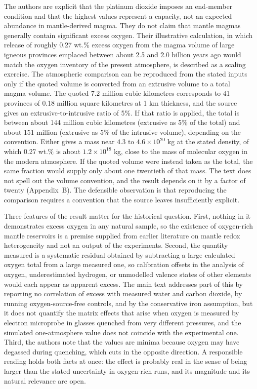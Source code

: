 \documentclass[11pt]{article}
\begin{document}
The authors are explicit that the platinum dioxide imposes an end-member condition and that the highest values represent a capacity, not an expected abundance in mantle-derived magma. They do not claim that mantle magmas generally contain significant excess oxygen. Their illustrative calculation, in which release of roughly 0.27 wt.\% excess oxygen from the magma volume of large igneous provinces emplaced between about 2.5 and 2.0 billion years ago would match the oxygen inventory of the present atmosphere, is described as a scaling exercise. The atmospheric comparison can be reproduced from the stated inputs only if the quoted volume is converted from an extrusive volume to a total magma volume. The quoted 7.2 million cubic kilometres corresponds to 41 provinces of 0.18 million square kilometres at 1 km thickness, and the source gives an extrusive-to-intrusive ratio of 5\%. If that ratio is applied, the total is between about 144 million cubic kilometres (extrusive as 5\% of the total) and about 151 million (extrusive as 5\% of the intrusive volume), depending on the convention. Either gives a mass near $4.3$ to $4.6 \times 10^{20}$ kg at the stated density, of which 0.27 wt.\% is about $1.2 \times 10^{18}$ kg, close to the mass of molecular oxygen in the modern atmosphere. If the quoted volume were instead taken as the total, the same fraction would supply only about one twentieth of that mass. The text does not spell out the volume convention, and the result depends on it by a factor of twenty (Appendix~B). The defensible observation is that reproducing the comparison requires a convention that the source leaves insufficiently explicit.

Three features of the result matter for the historical question. First, nothing in it demonstrates excess oxygen in any natural sample, so the existence of oxygen-rich mantle reservoirs is a premise supplied from earlier literature on mantle redox heterogeneity and not an output of the experiments. Second, the quantity measured is a systematic residual obtained by subtracting a large calculated oxygen total from a large measured one, so calibration offsets in the analysis of oxygen, underestimated hydrogen, or unmodelled valence states of other elements would each appear as apparent excess. The main text addresses part of this by reporting no correlation of excess with measured water and carbon dioxide, by running oxygen-source-free controls, and by the conservative iron assumption, but it does not quantify the matrix effects that arise when oxygen is measured by electron microprobe in glasses quenched from very different pressures, and the simulated one-atmosphere value does not coincide with the experimental one. Third, the authors note that the values are minima because oxygen may have degassed during quenching, which cuts in the opposite direction. A responsible reading holds both facts at once: the effect is probably real in the sense of being larger than the stated uncertainty in oxygen-rich runs, and its magnitude and its natural relevance are open.
\end{document}
